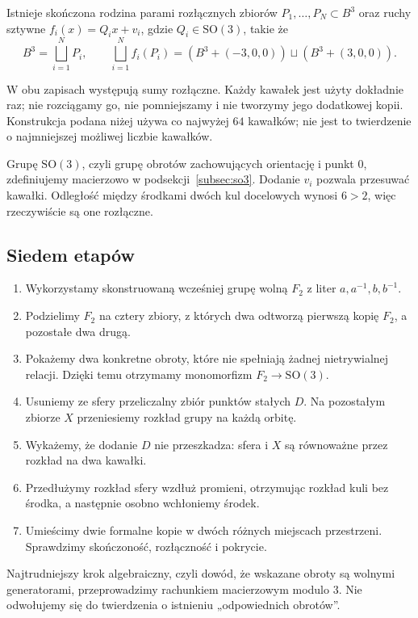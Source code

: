 \begin{twierdzenie}\label{tw:banach-tarski}
Istnieje skończona rodzina parami rozłącznych zbiorów $P_1,\ldots,P_N\subset B^3$ oraz ruchy sztywne $f_i(x)=Q_ix+v_i$, gdzie $Q_i\in\mathrm{SO}(3)$, takie że
\[
 B^3=\bigsqcup_{i=1}^{N}P_i,\qquad
 \bigsqcup_{i=1}^{N}f_i(P_i)
 =(B^3+(-3,0,0))\sqcup(B^3+(3,0,0)).
\]
\end{twierdzenie}
W obu zapisach występują sumy rozłączne. Każdy kawałek jest użyty dokładnie raz; nie rozciągamy go, nie pomniejszamy i nie tworzymy jego dodatkowej kopii. Konstrukcja podana niżej używa co najwyżej $64$ kawałków; nie jest to twierdzenie o najmniejszej możliwej liczbie kawałków.

Grupę $\mathrm{SO}(3)$, czyli grupę obrotów zachowujących orientację i punkt $0$, zdefiniujemy macierzowo w podsekcji~\ref{subsec:so3}. Dodanie $v_i$ pozwala przesuwać kawałki. Odległość między środkami dwóch kul docelowych wynosi $6>2$, więc rzeczywiście są one rozłączne.

\subsection{Siedem etapów}
\begin{enumerate}
\item Wykorzystamy skonstruowaną wcześniej grupę wolną $F_2$ z liter $a,a^{-1},b,b^{-1}$.
\item Podzielimy $F_2$ na cztery zbiory, z których dwa odtworzą pierwszą kopię $F_2$, a pozostałe dwa drugą.
\item Pokażemy dwa konkretne obroty, które nie spełniają żadnej nietrywialnej relacji. Dzięki temu otrzymamy monomorfizm $F_2\to\mathrm{SO}(3)$.
\item Usuniemy ze sfery przeliczalny zbiór punktów stałych $D$. Na pozostałym zbiorze $X$ przeniesiemy rozkład grupy na każdą orbitę.
\item Wykażemy, że dodanie $D$ nie przeszkadza: sfera i $X$ są równoważne przez rozkład na dwa kawałki.
\item Przedłużymy rozkład sfery wzdłuż promieni, otrzymując rozkład kuli bez środka, a następnie osobno wchłoniemy środek.
\item Umieścimy dwie formalne kopie w dwóch różnych miejscach przestrzeni. Sprawdzimy skończoność, rozłączność i pokrycie.
\end{enumerate}
Najtrudniejszy krok algebraiczny, czyli dowód, że wskazane obroty są wolnymi generatorami, przeprowadzimy rachunkiem macierzowym modulo $3$. Nie odwołujemy się do twierdzenia o istnieniu „odpowiednich obrotów”.

